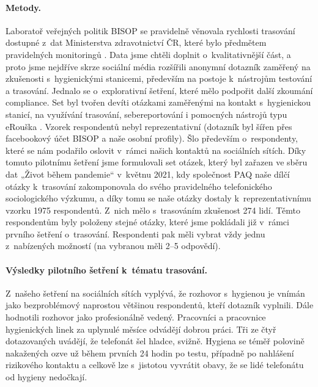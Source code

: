 \paragraph*{Metody.}
Laboratoř veřejných politik BISOP se pravidelně věnovala rychlosti trasování dostupné z~dat Ministerstva zdravotnictví ČR, které bylo předmětem pravidelných monitoringů \cite{Blechova,Blechova2020}. Data jsme chtěli doplnit o~kvalitativnější část, a proto jsme nejdříve skrze sociální média rozšířili anonymní dotazník zaměřený na zkušenosti s~hygienickými stanicemi, především na postoje k~nástrojům testování a trasování. Jednalo se o~explorativní šetření, které mělo podpořit další zkoumání compliance. Set byl tvořen devíti otázkami zaměřenými na kontakt s~hygienickou stanicí, na využívání trasování, sebereportování i pomocných nástrojů typu eRouška \cite{Erouska.cz2020}. Vzorek respondentů nebyl reprezentativní (dotazník byl šířen přes facebookový účet BISOP a naše osobní profily). Šlo především o~respondenty, které se nám podařilo oslovit v~rámci našich kontaktů na sociálních sítích. 
Díky tomuto pilotnímu šetření jsme formulovali set otázek, který byl zařazen ve sběru dat „Život během pandemie“ v~květnu 2021, kdy společnost PAQ \cite{Prokop2021a} naše dílčí otázky k~trasování zakomponovala do svého pravidelného telefonického sociologického výzkumu, a díky tomu se naše otázky dostaly k~reprezentativnímu vzorku 1975 respondentů. 
Z~nich mělo s~trasováním zkušenost 274 lidí. Těmto respondentům byly položeny stejné otázky, které jsme pokládali již v~rámci prvního šetření o~trasování. Respondenti pak měli vybrat vždy jednu z~nabízených možností (na vybranou měli 2--5 odpovědí). 

\paragraph*{Výsledky pilotního šetření k~tématu trasování.}
Z~našeho šetření na sociálních sítích vyplývá, že rozhovor s~hygienou je vnímán jako bezproblémový naprostou většinou respondentů, kteří dotazník vyplnili. Dále hodnotili rozhovor jako profesionálně vedený. Pracovníci a pracovnice hygienických linek za uplynulé měsíce odvádějí dobrou práci. Tři ze čtyř dotazovaných uvádějí, že telefonát šel hladce, svižně. Hygiena se téměř polovině nakažených ozve už během prvních 24 hodin po testu, případně po nahlášení rizikového kontaktu a celkově lze s~jistotou vyvrátit obavy, že se lidé telefonátu od hygieny nedočkají.


